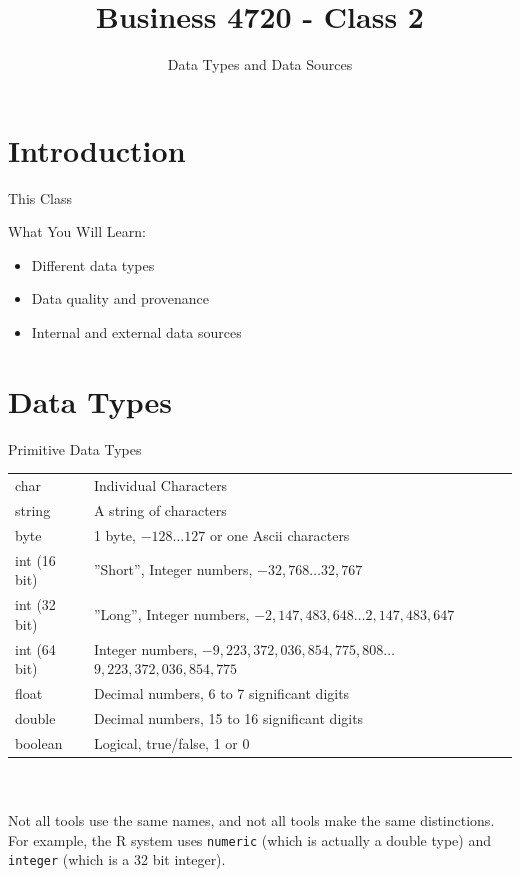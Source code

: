 \documentclass[ignorenonframetext,xcolor=x11names]{beamer}
\title{Business 4720 - Class 2}
\subtitle{Data Types and Data Sources}
\begin{document}
\begin{frame}{}
  \titlepage
  \footnotesize
  
\end{frame}

\section{Introduction}

\begin{frame}{This Class}

\begin{block}{What You Will Learn:}
\begin{itemize}
  \item Different data types
  \item Data quality and provenance
  \item Internal and external data sources
\end{itemize}
\end{block}
\end{frame}

\section{Data Types}

\begin{frame}{Primitive Data Types}
\small
\renewcommand{\arraystretch}{1.25}

\begin{tabularx}{\textwidth}{l|X} \hline
char 			& Individual Characters\\
string			& A string of characters\\
byte			& 1 byte, $-128 \ldots 127$ or one Ascii characters \\
int (16 bit)	& ''Short'', Integer numbers, $-32,768 \ldots 32,767$ \\ 
int (32 bit)	& ''Long'', Integer numbers, $-2,147,483,648 \ldots 2,147,483,647$ \\
int (64 bit)	& Integer numbers, $-9,223,372,036,854,775,808 \ldots$ $9,223,372,036,854,775$ \\
float			& Decimal numbers, 6 to 7 significant digits \\
double			& Decimal numbers, 15 to 16 significant digits \\
boolean			& Logical, true/false, 1 or 0 \\ \hline
\end{tabularx} \\
\vspace{5mm} \\
Not all tools use the same names, and not all tools make the same distinctions. For example, the R system uses \texttt{numeric} (which is actually a double type) and \texttt{integer} (which is a 32 bit integer).
\end{frame}
\end{document}
